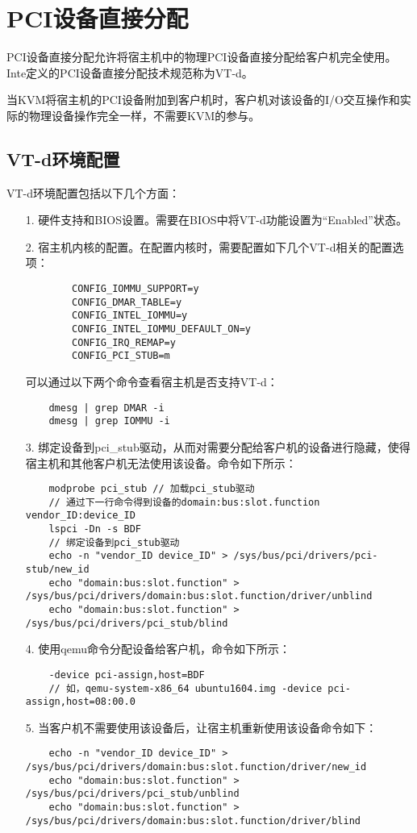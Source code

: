 \documentclass[a4paper,left=2.5cm,right=2.5cm,11pt]{article}
\begin{document}
\section{PCI设备直接分配}
	PCI设备直接分配允许将宿主机中的物理PCI设备直接分配给客户机完全使用。
	Inte定义的PCI设备直接分配技术规范称为VT-d。\par
	当KVM将宿主机的PCI设备附加到客户机时，客户机对该设备的I/O交互操作和实际的物理设备操作完全一样，不需要KVM的参与。

\subsection{VT-d环境配置}
	VT-d环境配置包括以下几个方面：
	\begin{itemize}
		\item[1.] 硬件支持和BIOS设置。需要在BIOS中将VT-d功能设置为“Enabled”状态。
		\item[2.] 宿主机内核的配置。在配置内核时，需要配置如下几个VT-d相关的配置选项：
		\begin{lstlisting}
		CONFIG_IOMMU_SUPPORT=y
		CONFIG_DMAR_TABLE=y
		CONFIG_INTEL_IOMMU=y
		CONFIG_INTEL_IOMMU_DEFAULT_ON=y
		CONFIG_IRQ_REMAP=y
		CONFIG_PCI_STUB=m
		\end{lstlisting}

		可以通过以下两个命令查看宿主机是否支持VT-d：
		\begin{lstlisting}
	dmesg | grep DMAR -i
	dmesg | grep IOMMU -i
		\end{lstlisting}

		\item[3.] 绑定设备到pci\_stub驱动，从而对需要分配给客户机的设备进行隐藏，使得宿主机和其他客户机无法使用该设备。命令如下所示：
		\begin{lstlisting}
	modprobe pci_stub // 加载pci_stub驱动
	// 通过下一行命令得到设备的domain:bus:slot.function vendor_ID:device_ID
	lspci -Dn -s BDF
	// 绑定设备到pci_stub驱动
	echo -n "vendor_ID device_ID" > /sys/bus/pci/drivers/pci-stub/new_id
	echo "domain:bus:slot.function" > /sys/bus/pci/drivers/domain:bus:slot.function/driver/unblind
	echo "domain:bus:slot.function" > /sys/bus/pci/drivers/pci_stub/blind
		\end{lstlisting}

		\item[4.] 使用qemu命令分配设备给客户机，命令如下所示：
		\begin{lstlisting}
	-device pci-assign,host=BDF
	// 如，qemu-system-x86_64 ubuntu1604.img -device pci-assign,host=08:00.0
		\end{lstlisting}

		\item[5.] 当客户机不需要使用该设备后，让宿主机重新使用该设备命令如下：
		\begin{lstlisting}
	echo -n "vendor_ID device_ID" > /sys/bus/pci/drivers/domain:bus:slot.function/driver/new_id
	echo "domain:bus:slot.function" > /sys/bus/pci/drivers/pci_stub/unblind
	echo "domain:bus:slot.function" > /sys/bus/pci/drivers/domain:bus:slot.function/driver/blind
		\end{lstlisting}
	\end{itemize}
\end{document}
